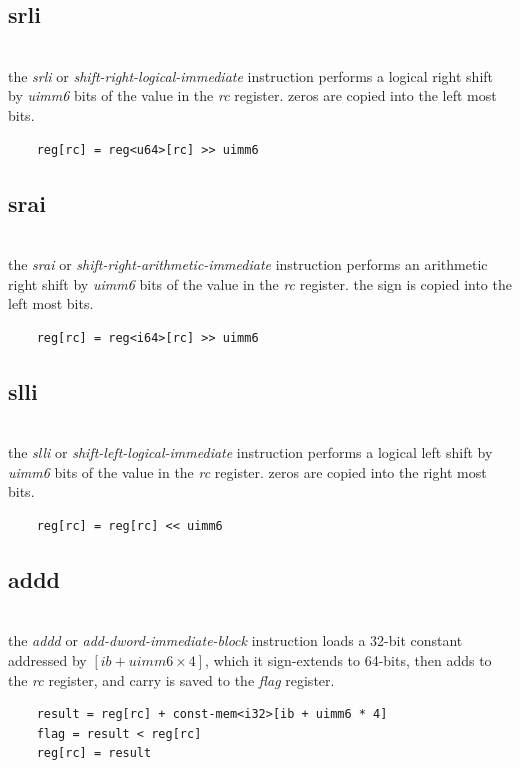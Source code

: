 \subsection{srli}
\\
the \emph{srli} or \emph{shift-right-logical-immediate} instruction
performs a logical right shift by \emph{uimm6} bits of the value in
the \emph{rc} register. zeros are copied into the left most bits.
\begin{Verbatim}
    reg[rc] = reg<u64>[rc] >> uimm6
\end{Verbatim}

\subsection{srai}
\\
the \emph{srai} or \emph{shift-right-arithmetic-immediate} instruction
performs an arithmetic right shift by \emph{uimm6} bits of the value in
the \emph{rc} register. the sign is copied into the left most bits.
\begin{Verbatim}
    reg[rc] = reg<i64>[rc] >> uimm6
\end{Verbatim}

\subsection{slli}
\\
the \emph{slli} or \emph{shift-left-logical-immediate} instruction
performs a logical left shift by \emph{uimm6} bits of the value in
the \emph{rc} register. zeros are copied into the right most bits.
\begin{Verbatim}
    reg[rc] = reg[rc] << uimm6
\end{Verbatim}

\subsection{addd}
\\
the \emph{addd} or \emph{add-dword-immediate-block} instruction loads
a 32-bit constant addressed by \emph{$[ib + uimm6 \times 4]$}, which it
sign-extends to 64-bits, then adds to the \emph{rc} register,
and carry is saved to the \emph{flag} register.
\begin{Verbatim}
    result = reg[rc] + const-mem<i32>[ib + uimm6 * 4]
    flag = result < reg[rc]
    reg[rc] = result
\end{Verbatim}

